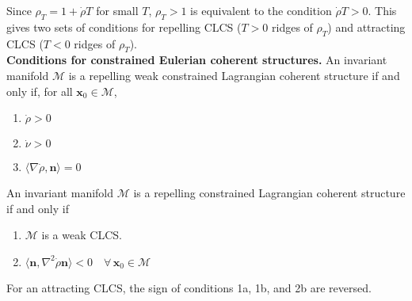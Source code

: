 \documentclass[onecolumn,3p]{elsarticle}
\begin{document}
	Since $\rho_T = 1+\dot{\rho}T$ for small $T$, $\rho_T>1$ is equivalent to the condition $\dot{\rho}T>0$. This gives two sets of conditions for repelling CLCS ($T>0$ ridges of $\rho_T$) and attracting CLCS ($T<0$ ridges of $\rho_T$). \\
	
	\noindent \textbf{Conditions for constrained Eulerian coherent structures.} An invariant manifold $\mathcal{M}$ is a repelling weak constrained Lagrangian coherent structure if and only if, for all $\mathbf{x}_0 \in \mathcal{M}$,
	\begin{enumerate}[label=1\alph*.]
		\item $\dot{\rho} > 0$
		\item $\dot{\nu} > 0$
		\item $\langle \nabla \dot{\rho}, \mathbf{n} \rangle = 0$
	\end{enumerate}
	
	An invariant manifold $\mathcal{M}$ is a repelling constrained Lagrangian coherent structure if and only if
	\begin{enumerate}[label=2\alph*.]
		\item $\mathcal{M}$ is a weak CLCS.
		\item $\langle \mathbf{n}, \nabla^2\dot{\rho}\mathbf{n} \rangle < 0 \quad \forall \, \mathbf{x}_0 \in \mathcal{M}$ \\
	\end{enumerate}

	For an attracting CLCS, the sign of conditions 1a, 1b, and 2b are reversed.
	
%
%	
	
\end{document}
